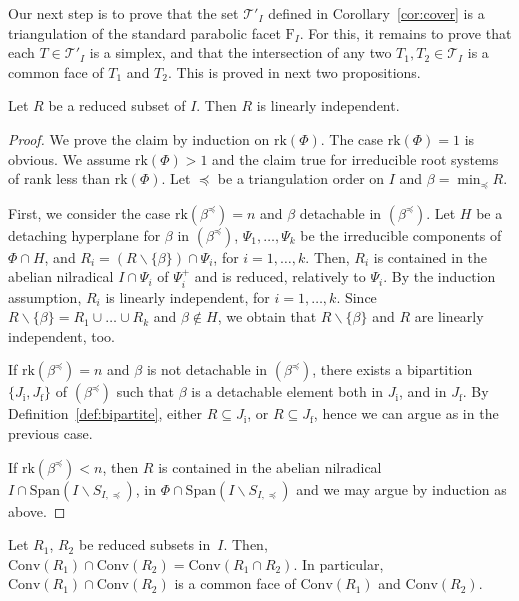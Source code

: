\documentclass[ALCO,published]{cedram}
\theoremstyle{plain}
\newcommand\mc{\mathcal}
\newcommand\smeno{\smallsetminus}
\newcommand\conv{\mathrm{Conv}}
\newcommand\gen{\mathrm{Span}}
\newcommand\rk{\mathrm{rk}}
\newcommand\be{\beta}
\newcommand\preq{\preccurlyeq}
\begin{document}
Our next step is to prove that the set $\mc T'_I$ defined in Corollary~\ref{cor:cover} is a triangulation of the standard parabolic facet $\mathrm F_I$. 
For this, it remains  to prove that each   $T\in \mathcal T'_I$ is a simplex,  and that the intersection of any two $T_1, T_2\in \mathcal T_I$ is a common face of $T_1$ and $T_2$. 
This is proved in next two propositions.

\begin{pro}\label{pro:reduced-are-independent}
Let $R$ be a reduced subset of $I$. Then $R$ is linearly independent. 
\end{pro}

\begin{proof}
We prove the claim by induction on $\rk(\Phi)$.
The case $\rk(\Phi)=1$ is obvious. We assume $\rk(\Phi)> 1$ and the claim true for irreducible root systems of rank less than $\rk(\Phi)$.
Let $\preq$ be a  triangulation order on $I$ and $\be=\min_\preq R$. 
\par
First, we consider the case $\rk(\be^\preq)=n$ and $\be$ detachable in  $(\be^\preq)$. 
Let $H$ be a detaching hyperplane for $\be$ in  $(\be^\preq)$, $\Psi_1, \dots, \Psi_k$ be the irreducible components of  $\Phi\cap H$, and $R_i=(R\smeno\{\be\})\cap \Psi_i$, for $i=1, \dots, k$.
Then, $R_i$ is contained in the abelian nilradical $I\cap \Psi_i$ of $\Psi_i^+$ and is reduced, relatively to $\Psi_i$.
By the induction assumption, $R_i$ is linearly independent, for $i=1, \dots, k$. 
Since $R\smeno\{\be\}=R_1\cup\dots\cup R_k$ and $\be\not\in H$, we obtain that $R\smeno \{\be\}$ and $R$ are linearly independent, too.
\par
If $\rk(\be^\preq)=n$ and $\be$ is not detachable in  $(\be^\preq)$, there exists a bipartition  $\{J_{\mathrm i}, J_{\mathrm f}\}$ of  $(\be^\preq)$ such that $\be$ is a detachable element both in $J_{\mathrm i}$, and in $J_{\mathrm f}$.
By Definition~\ref{def:bipartite}, either  $R\subseteq J_{\mathrm i}$, or $R\subseteq J_{\mathrm f}$, hence we can argue as in the previous case.
\par
If $\rk(\be^\preq)<n$, then $R$ is contained in the abelian nilradical $I\cap \gen(I\smeno S_{I, \preq})$, in $\Phi\cap \gen(I\smeno S_{I, \preq})$
and we may argue  by induction  as above. 
\end{proof}

\begin{pro}\label{pro:intersection}
Let $R_1$, $R_2$ be reduced subsets in~$I$. 
Then, $\conv(R_1)\cap\conv(R_2)=\conv(R_1\cap R_2)$. 
In particular,  $\conv(R_1)\cap\conv(R_2)$ is a common face of  $\conv(R_1)$ and $\conv(R_2)$. 
\end{pro}
\end{document}
